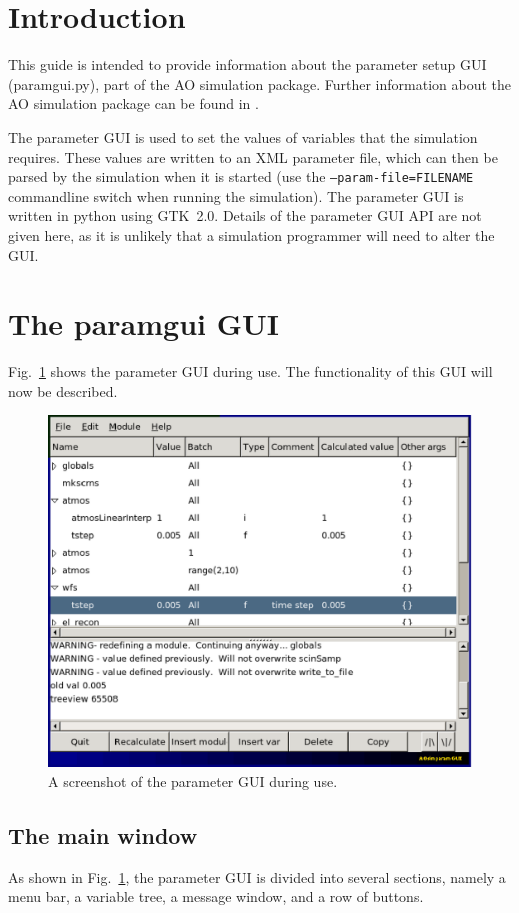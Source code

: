 \documentclass{article}
\begin{document}


\section{Introduction}
This guide is intended to provide information about the parameter
setup GUI (paramgui.py), part of the AO simulation package.  Further
information about the AO simulation package can be found in
\citet{overview}.

The parameter GUI is used to set the values of variables that the
simulation requires.  These values are written to an XML parameter
file, which can then be parsed by the simulation when it is started
(use the \texttt{--param-file=FILENAME} commandline switch when
running the simulation).  The parameter GUI is written in python using
GTK~2.0.  Details of the parameter GUI API are not given here, as it
is unlikely that a simulation programmer will need to alter the GUI.

\section{The paramgui GUI}
Fig.~\ref{fig:paramgui} shows the parameter GUI during use.  The
functionality of this GUI will now be described.
\begin{figure}
\includegraphics{pics/paramguimain.eps}
\caption{A screenshot of the parameter GUI during use.}
\label{fig:paramgui}
\end{figure}


\subsection{The main window}
As shown in Fig.~\ref{fig:paramgui}, the parameter GUI is divided into
several sections, namely a menu bar, a variable tree, a message
window, and a row of buttons.  
\end{document}
